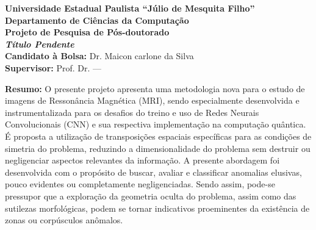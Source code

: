 \documentclass[a4paper, 12pt]{report}
\begin{document}
\begin{titlepage}
\begin{center}
\textbf{Universidade Estadual Paulista \textquotedblleft{Júlio de Mesquita Filho}\textquotedblright}\\
\textbf{Departamento de Ciências da Computação}\\
\vspace{2cm}
\textbf{Projeto de Pesquisa de Pós-doutorado}\\
\vspace{2cm}
\textbf{\textit{{\Large Título Pendente}}}\\
\vspace{2cm}
\textbf{Candidato à Bolsa:} Dr. Maicon carlone da Silva\\
\textbf{Supervisor:} Prof. Dr. ---%
\vspace{2cm}
\end{center}
\textbf{Resumo:}
O presente projeto apresenta uma metodologia nova para o estudo de imagens de Ressonância Magnética (MRI), sendo especialmente desenvolvida e instrumentalizada para os desafios do treino e uso de Redes Neurais Convolucionais (CNN) e sua respectiva implementação na computação quântica. É proposta a utilização de transposições espaciais específicas para as condições de simetria do problema, reduzindo a dimensionalidade do problema sem destruir ou negligenciar aspectos relevantes da informação. A presente abordagem foi desenvolvida com o propósito de buscar, avaliar e classificar anomalias elusivas, pouco evidentes ou completamente negligenciadas. Sendo assim, pode-se pressupor que a exploração da geometria oculta do problema, assim como das sutilezas morfológicas, podem se tornar indicativos proeminentes da existência de zonas ou corpúsculos anômalos.

\end{titlepage}
\end{document}
